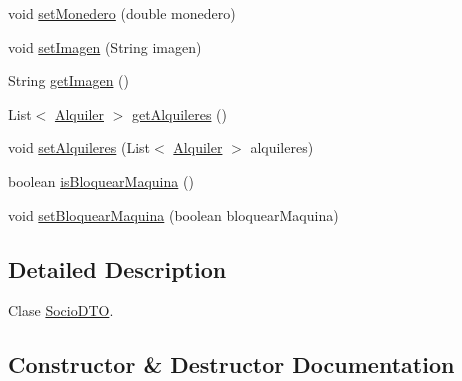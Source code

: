 \begin{DoxyCompactItemize}
void \mbox{\hyperlink{classes_1_1deusto_1_1server_1_1dto_1_1_socio_d_t_o_a37f48e00e74e18cb21eeaf00f444fbef}{set\+Monedero}} (double monedero)
\item 
void \mbox{\hyperlink{classes_1_1deusto_1_1server_1_1dto_1_1_socio_d_t_o_ac9a4d6ccd94aea976005f5191c5f4dbf}{set\+Imagen}} (String imagen)
\item 
String \mbox{\hyperlink{classes_1_1deusto_1_1server_1_1dto_1_1_socio_d_t_o_a8d119e5a035540c15c388259e4e81005}{get\+Imagen}} ()
\item 
List$<$ \mbox{\hyperlink{classes_1_1deusto_1_1client_1_1data_1_1_alquiler}{Alquiler}} $>$ \mbox{\hyperlink{classes_1_1deusto_1_1server_1_1dto_1_1_socio_d_t_o_aef5faa0df13d41fb8e900ea22e3d204f}{get\+Alquileres}} ()
\item 
void \mbox{\hyperlink{classes_1_1deusto_1_1server_1_1dto_1_1_socio_d_t_o_a8b67bdd58091905e9ad7c759f7904320}{set\+Alquileres}} (List$<$ \mbox{\hyperlink{classes_1_1deusto_1_1client_1_1data_1_1_alquiler}{Alquiler}} $>$ alquileres)
\item 
boolean \mbox{\hyperlink{classes_1_1deusto_1_1server_1_1dto_1_1_socio_d_t_o_a5e1acb06533d9c944e0e30c8f6b846fe}{is\+Bloquear\+Maquina}} ()
\item 
void \mbox{\hyperlink{classes_1_1deusto_1_1server_1_1dto_1_1_socio_d_t_o_a7e34b405a06d4e83fb65974691f6a9fb}{set\+Bloquear\+Maquina}} (boolean bloquear\+Maquina)
\end{DoxyCompactItemize}


\subsection{Detailed Description}
Clase \mbox{\hyperlink{classes_1_1deusto_1_1server_1_1dto_1_1_socio_d_t_o}{Socio\+D\+TO}}. 

\subsection{Constructor \& Destructor Documentation}
\mbox{\label{classes_1_1deusto_1_1server_1_1dto_1_1_socio_d_t_o_a5020ced46cab38213721841e56d9f38f}} 
